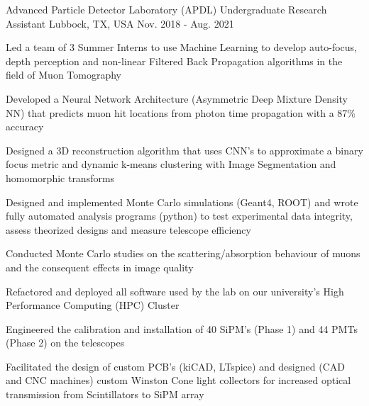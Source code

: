 \begin{cventries}
    \cventry
    {Advanced Particle Detector Laboratory (APDL)}
    {Undergraduate Research Assistant}
    {Lubbock, TX, USA}
    {Nov. 2018 - Aug. 2021}
    {
        \begin{cvitems}
        \item{Led a team of 3 Summer Interns to use Machine Learning to develop auto-focus, depth perception and non-linear Filtered Back Propagation algorithms in the field of Muon Tomography}
        \item{Developed a Neural Network Architecture (Asymmetric Deep Mixture Density NN) that predicts muon hit locations from photon time propagation with a 87\% accuracy}
        \item{Designed a 3D reconstruction algorithm that uses CNN's to approximate a binary focus metric and dynamic k-means clustering with Image Segmentation and homomorphic transforms}
        \item{Designed and implemented Monte Carlo simulations (Geant4, ROOT) and wrote fully automated analysis programs (python) to test experimental data integrity, assess theorized designs and measure telescope efficiency}
        \item{Conducted Monte Carlo studies on the scattering/absorption behaviour of muons and the consequent effects in image quality}
        \item{Refactored and deployed all software used by the lab on our university's High Performance Computing (HPC) Cluster}
        \item{Engineered the calibration and installation of 40 SiPM's (Phase 1) and 44 PMTs (Phase 2) on the telescopes}
        \item{Facilitated the design of custom PCB's (kiCAD, LTspice) and designed (CAD and CNC machines) custom Winston Cone light collectors for increased optical transmission from Scintillators to SiPM array} 

\end{cvitems}}
\end{cventries}

